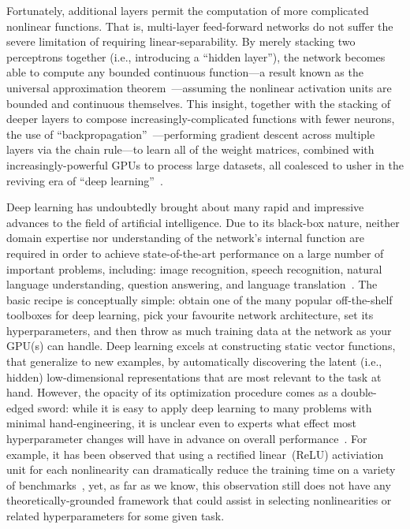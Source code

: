 Fortunately, additional layers permit the computation of more complicated nonlinear functions.
That is, multi-layer feed-forward networks do not suffer the severe limitation of requiring linear-separability.
By merely stacking two perceptrons together (i.e., introducing a ``hidden layer''), the network becomes able to compute any bounded continuous function---a result known as the universal approximation theorem~\citep{hornik1989multilayer}---assuming the nonlinear activation units are bounded and continuous themselves.
This insight, together with the stacking of deeper layers to compose increasingly-complicated functions with fewer neurons, the use of ``backpropagation''~\citep{werbos1974beyond, rumelhart1986learning}---performing gradient descent across multiple layers via the chain rule---to learn all of the weight matrices, combined with increasingly-powerful GPUs to process large datasets, all coalesced to usher in the reviving era of ``deep learning''~\citep{sejnowski2018deep}.

Deep learning has undoubtedly brought about many rapid and impressive advances to the field of artificial intelligence.
Due to its black-box nature, neither domain expertise nor understanding of the network's internal function are required in order to achieve state-of-the-art performance on a large number of important problems, including: image recognition, speech recognition, natural language understanding, question answering, and language translation~\citep{lecun2015deep}.
The basic recipe is conceptually simple: obtain one of the many popular off-the-shelf toolboxes for deep learning, pick your favourite network architecture, set its hyperparameters, and then throw as much training data at the network as your GPU(s) can handle.
Deep learning excels at constructing static vector functions, that generalize to new examples, by automatically discovering the latent (i.e., hidden) low-dimensional representations that are most relevant to the task at hand.
However, the opacity of its optimization procedure comes as a double-edged sword: while it is easy to apply deep learning to many problems with minimal hand-engineering, it is unclear even to experts what effect most hyperparameter changes will have in advance on overall performance~\citep{bergstra2012random}.
For example, it has been observed that using a rectified linear~(ReLU) activiation unit for each nonlinearity can dramatically reduce the training time on a variety of benchmarks~\citep{glorot2011deep}, yet, as far as we know, this observation still does not have any theoretically-grounded framework that could assist in selecting nonlinearities or related hyperparameters for some given task.

